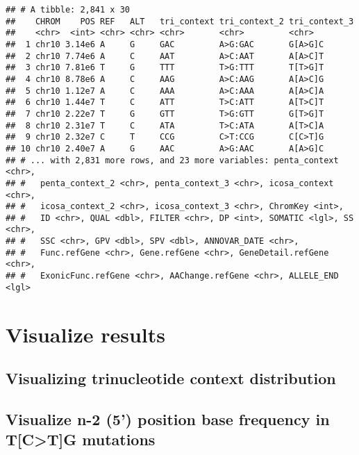\documentclass[]{article}
\begin{document}
\begin{verbatim}
## # A tibble: 2,841 x 30
##    CHROM    POS REF   ALT   tri_context tri_context_2 tri_context_3
##    <chr>  <int> <chr> <chr> <chr>       <chr>         <chr>        
##  1 chr10 3.14e6 A     G     GAC         A>G:GAC       G[A>G]C      
##  2 chr10 7.74e6 A     C     AAT         A>C:AAT       A[A>C]T      
##  3 chr10 7.81e6 T     G     TTT         T>G:TTT       T[T>G]T      
##  4 chr10 8.78e6 A     C     AAG         A>C:AAG       A[A>C]G      
##  5 chr10 1.12e7 A     C     AAA         A>C:AAA       A[A>C]A      
##  6 chr10 1.44e7 T     C     ATT         T>C:ATT       A[T>C]T      
##  7 chr10 2.22e7 T     G     GTT         T>G:GTT       G[T>G]T      
##  8 chr10 2.31e7 T     C     ATA         T>C:ATA       A[T>C]A      
##  9 chr10 2.32e7 C     T     CCG         C>T:CCG       C[C>T]G      
## 10 chr10 2.40e7 A     G     AAC         A>G:AAC       A[A>G]C      
## # ... with 2,831 more rows, and 23 more variables: penta_context <chr>,
## #   penta_context_2 <chr>, penta_context_3 <chr>, icosa_context <chr>,
## #   icosa_context_2 <chr>, icosa_context_3 <chr>, ChromKey <int>,
## #   ID <chr>, QUAL <dbl>, FILTER <chr>, DP <int>, SOMATIC <lgl>, SS <chr>,
## #   SSC <chr>, GPV <dbl>, SPV <dbl>, ANNOVAR_DATE <chr>,
## #   Func.refGene <chr>, Gene.refGene <chr>, GeneDetail.refGene <chr>,
## #   ExonicFunc.refGene <chr>, AAChange.refGene <chr>, ALLELE_END <lgl>
\end{verbatim}

\hypertarget{visualize-results}{%
\section{Visualize results}\label{visualize-results}}

\hypertarget{visualizing-trinucleotide-context-distribution}{%
\subsection{Visualizing trinucleotide context
distribution}\label{visualizing-trinucleotide-context-distribution}}

\hypertarget{visualize-n-2-5-position-base-frequency-in-tctg-mutations}{%
\subsection{Visualize n-2 (5') position base frequency in
T{[}C\textgreater T{]}G
mutations}\label{visualize-n-2-5-position-base-frequency-in-tctg-mutations}}
\end{document}

